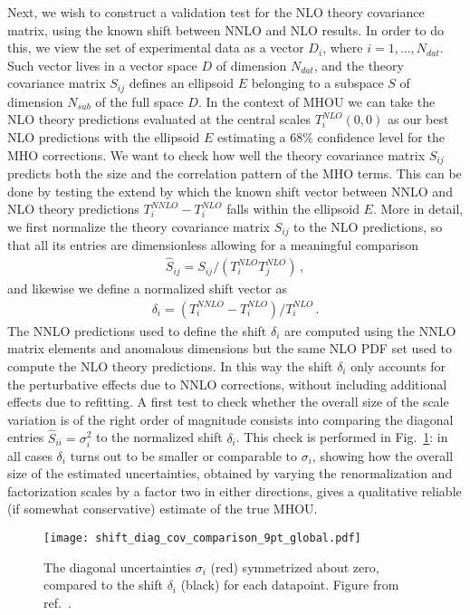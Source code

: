     Next, we wish to construct a validation test for the NLO theory covariance matrix, using the known shift between
    NNLO and NLO results.
    In order to do this, we view the set of experimental data as a vector $D_i$, where $i = 1, ..., N_{dat}$.
    Such vector lives in a vector space $D$ of dimension $N_{dat}$, and
    the theory covariance matrix $S_{ij}$ defines an ellipsoid $E$ belonging to a subspace $S$ of dimension
    $N_{sub}$ of the full space $D$. 
    In the context of MHOU we can take the NLO theory predictions evaluated at the central scales $T_i^{NLO}\left(0,0\right)$
    as our best NLO predictions with the ellipsoid $E$ estimating a $68\%$ confidence level for the MHO corrections. 
    We want to check how well the theory covariance matrix $S_{ij}$ predicts both the size and the correlation pattern
    of the MHO terms. This can be done by testing the extend by which the known shift vector between NNLO and NLO theory predictions
    $T_i^{NNLO} - T_i^{NLO}$
    falls within the ellipsoid $E$.
    More in detail, we first normalize the theory covariance matrix $S_{ij}$ to the NLO predictions, so that all its
    entries are dimensionless allowing for a meaningful comparison 
    \begin{align}
        \hat{S}_{ij} = S_{ij}/\left(T_i^{NLO}T_j^{NLO}\right)\,,
    \end{align}
    and likewise we define a normalized shift vector as
    \begin{align}
        \delta_i = \left(T_i^{NNLO}-T_i^{NLO}\right)/T_i^{NLO}\,.
    \end{align}
    The NNLO predictions used to define the shift $\delta_i$ are computed using the NNLO matrix elements and anomalous dimensions
    but the same NLO PDF set used to compute the NLO theory predictions. In this way the shift $\delta_i$ 
    only accounts for the perturbative effects due to NNLO corrections, without including additional effects
    due to refitting.
    A first test to check whether the overall size of the scale variation is of the right order of magnitude
    consists into comparing the diagonal entries $\hat{S}_{ii} = \sigma_i^2$ to the normalized shift $\delta_i$.
    This check is performed in Fig.~\ref{fig:diag_shift_validation_symmetric}: in all cases 
    $\delta_i$ turns out to be smaller or comparable to $\sigma_i$, showing how
    the overall size of the estimated uncertainties, obtained by varying the renormalization and factorization scales by
    a factor two in either directions, gives a qualitative reliable (if somewhat conservative) estimate of the true MHOU. 
    \begin{figure}[t!]
        \begin{center}
          \texttt{[image: shift\_diag\_cov\_comparison\_9pt\_global.pdf]}
          \caption{\small The diagonal uncertainties  $\sigma_i$ (red)
            symmetrized about zero,
            compared to the shift $\delta_i$ (black) for each
            datapoint. Figure from ref.~\cite{AbdulKhalek:2019ihb}.}
          \label{fig:diag_shift_validation_symmetric}
        \end{center}
    \end{figure}

